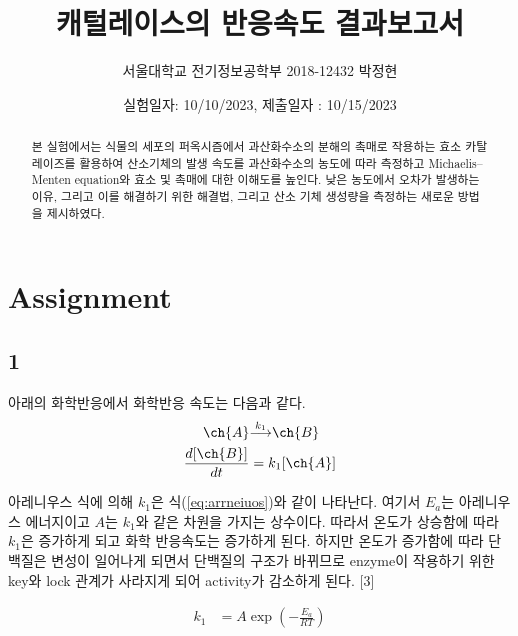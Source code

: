 \documentclass[%
 reprint,
 amsmath,amssymb,
 aps,
]{revtex4-2}
\begin{document}
\title{캐털레이스의 반응속도 결과보고서}

\author{서울대학교 전기정보공학부 2018-12432 박정현}
\date{실험일자: 10/10/2023, 제출일자 : 10/15/2023}%

\begin{abstract}
본 실험에서는 식물의 세포의 퍼옥시즘에서 과산화수소의 분해의 촉매로 작용하는 효소  카탈레이즈를 활용하여 산소기체의 발생 속도를 과산화수소의 농도에 따라 측정하고 Michaelis–Menten equation와 효소 및 촉매에 대한 이해도를 높인다. 낮은 농도에서 오차가 발생하는 이유, 그리고 이를 해결하기 위한 해결법, 그리고 산소 기체 생성량을 측정하는 새로운 방법을 제시하였다.
\end{abstract}

\maketitle


\section{\label{sec:level1}Assignment}
\subsection{\label{sec:level2} 1}
아래의 화학반응에서 화학반응 속도는 다음과 같다.
\begin{align}
	\ch{A} &{\overset{k_{1}}{\longrightarrow}} \ch{B}\\
	\frac{d[\ch{B}]}{dt} &= k_{1}[\ch{A}]
\end{align}

아레니우스 식에 의해 $k_{1}$은 식(\ref{eq:arrneiuos})와 같이 나타난다. 여기서 $E_{a}$는 아레니우스 에너지이고 $A$는 $k_{1}$와 같은 차원을 가지는 상수이다. 따라서 온도가 상승함에 따라 $k_{1}$은 증가하게 되고 화학 반응속도는 증가하게 된다. 하지만 온도가 증가함에 따라 단백질은 변성이 일어나게 되면서 단백질의 구조가 바뀌므로 enzyme이 작용하기 위한 key와 lock 관계가 사라지게 되어 activity가 감소하게 된다. [3] 

\begin{align}
	k_{1} &= A\exp\left(-\frac{E_{a}}{RT}\right)\label{eq:arrneiuos}
\end{align}
\end{document}
